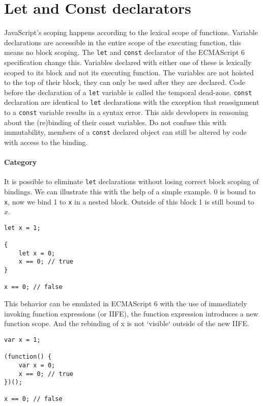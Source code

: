 \section{Let and Const declarators} \label{let-const}
JavaScript's scoping happens according to the lexical scope of functions. Variable declarations are accessible in the entire scope of the executing function, this means no block scoping. The \lstinline$let$ and \lstinline$const$ declarator of the ECMAScript 6 specification change this. Variables declared with either one of these is lexically scoped to its block and not its executing function. The variables are not hoisted to the top of their block, they can only be used after they are declared. Code before the declaration of a \lstinline$let$ variable is called the temporal dead-zone. \lstinline$const$ declaration are identical to \lstinline$let$ declarations with the exception that reassignment to a \lstinline$const$ variable results in a syntax error. This aids developers in reasoning about the (re)binding of their const variables. Do not confuse this with immutability, members of a \lstinline$const$ declared object can still be altered by code with access to the binding.

\paragraph{Category}
It is possible to eliminate \lstinline$let$ declarations without losing correct block scoping of bindings. We can illustrate this with the help of a simple example. 0 is bound to \lstinline$x$, now we bind 1 to \lstinline$x$ in a nested block. Outside of this block 1 is still bound to $x$.

\begin{lstlisting}
let x = 1;

{
	let x = 0;
	x == 0; // true
}

x == 0; // false
\end{lstlisting}

This behavior can be emulated in ECMAScript 6 with the use of immediately invoking function expressions (or IIFE), the function expression introduces a new function scope. And the rebinding of x is not `visible` outside of the new IIFE.

\begin{lstlisting}
var x = 1;

(function() {
	var x = 0;
	x == 0; // true
})();

x == 0; // false
\end{lstlisting}

